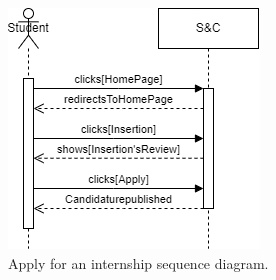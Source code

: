 \begin{figure}[H]
    \begin{center}
        \includegraphics[width=1\linewidth]{Images/image6.png}
        \caption{Apply for an internship sequence diagram.}
        \label{fig:apply_for_an_internship_seqdiag}%
    \end{center}
\end{figure}



